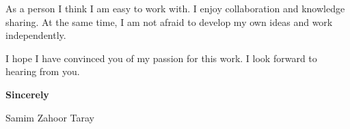 \documentclass[letterpaper,11pt]{article}
\begin{document}
As a person I think I am easy to work with. I enjoy collaboration and knowledge
sharing. At the same time, I am not afraid to develop my own ideas and work
independently.

I hope I have convinced you of my passion for this work. I look forward to
hearing from you.

\vspace{1cm}
\textbf{Sincerely}

Samim Zahoor Taray
\end{document}

